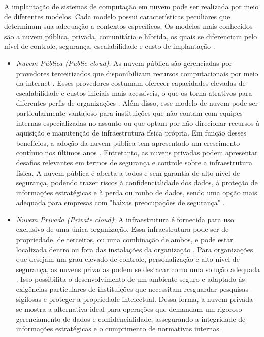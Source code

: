 A implantação de sistemas de computação em nuvem pode ser realizada por meio de diferentes modelos. Cada modelo possui características peculiares que determinam sua adequação a contextos específicos. Os modelos mais conhecidos são a nuvem pública, privada, comunitária e híbrida, os quais se diferenciam pelo nível de controle, segurança, escalabilidade e custo de implantação \cite{mell2011}.

\begin{itemize}
\item \emph{Nuvem Pública (\textit{Public cloud})}: As nuvem pública são gerenciadas por provedores terceirizados que disponibilizam recursos computacionais por meio da internet \cite{carroll2011}. Esses provedores costumam oferecer capacidades elevadas de escalabilidade e custos iniciais mais acessíveis, o que os torna atrativos para diferentes perfis de organizações \cite{amajuoyi2024}. Além disso, esse modelo de nuvem pode ser particularmente vantajoso para instituições que não contam com equipes internas especializadas no assunto ou que optam por não direcionar recursos à aquisição e manutenção de infraestrutura física própria. Em função desses benefícios, a adoção da nuvem pública tem apresentado um crescimento contínuo nos últimos anos \cite{amajuoyi2024}. Entretanto, as nuvens privadas podem apresentar desafios relevantes em termos de segurança e controle sobre a infraestrutura física. A nuvem pública é aberta a todos e sem garantia de alto nível de segurança, podendo trazer riscos à confidencialidade dos dados, à proteção de informações estratégicas e à perda ou roubo de dados, sendo uma opção mais adequada para empresas com "baixas preocupações de segurança" \cite{sathya2023}.

\item \emph{Nuvem Privada (\textit{Private cloud})}: A infraestrutura é fornecida para uso exclusivo de uma única organização. Essa infraestrutura pode ser de propriedade, de terceiros, ou uma combinação de ambos, e pode estar localizada dentro ou fora das instalações da organização \cite{mell2011}. Para organizações que desejam um grau elevado de controle, personalização e alto nível de segurança, as nuvens privadas podem se destacar como uma solução adequada \cite{swapna2023}. Isso possibilita o desenvolvimento de um ambiente seguro e adaptado às exigências particulares de instituições que necessitam resguardar pesquisas sigilosas e proteger a propriedade intelectual. Dessa forma, a nuvem privada se mostra a alternativa ideal para operações que demandam um rigoroso gerenciamento de dados e confidencialidade, assegurando a integridade de informações estratégicas e o cumprimento de normativas internas.


\end{itemize}
